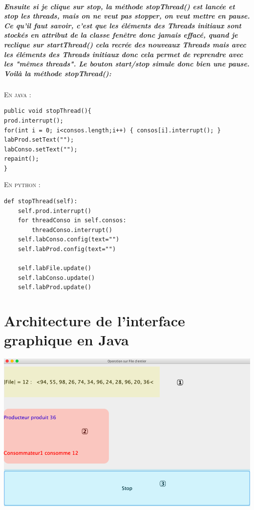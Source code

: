 \documentclass[a4paper]{report}
\begin{document}
\paragraph{Ensuite si je clique sur stop, la méthode stopThread() est lancée et stop les threads, mais on ne veut pas stopper, on veut mettre en pause.
Ce qu'il faut savoir, c'est que les éléments des Threads initiaux sont stockés en attribut de la classe fenêtre donc jamais effacé, quand je reclique sur startThread() cela recrée des nouveaux Threads mais avec les éléments des Threads initiaux donc cela permet de reprendre avec les "mêmes threads". Le bouton start/stop simule donc bien une pause. Voilà la méthode stopThread():}

\textsc{En java :}
\begin{verbatim}
public void stopThread(){
prod.interrupt();
for(int i = 0; i<consos.length;i++) { consos[i].interrupt(); }
labProd.setText("");
labConso.setText("");
repaint();
}
\end{verbatim}
\textsc{En python :}
\begin{verbatim}
def stopThread(self):
    self.prod.interrupt()
    for threadConso in self.consos:
        threadConso.interrupt()
    self.labConso.config(text="")
    self.labProd.config(text="")
        
    self.labFile.update()
    self.labConso.update()
    self.labProd.update()
\end{verbatim}

\chapter{Architecture de l'interface graphique en Java}

\includegraphics[width=1\textwidth]{./fen_java.png}
\end{document}
